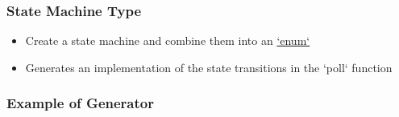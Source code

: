\begin{frame}[fragile]
    \frametitle{State Machine Type}
% 
% 
    \begin{itemize}
        \item Create a state machine and combine them into an \href{https://doc.rust-lang.org/book/ch06-01-defining-an-enum.html}{`enum`}


        \item Generates an implementation of the state transitions in the `poll` function
    \end{itemize}
% 
% 
% 
\end{frame}
\begin{frame}[fragile]
    \frametitle{Example of Generator}
% 
% 
% 
% 
% 
% 
\end{frame}

